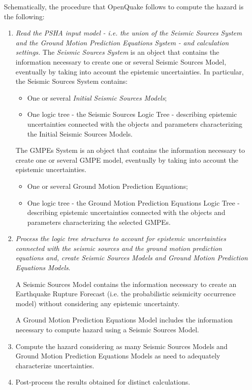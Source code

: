 Schematically, the procedure that OpenQuake follows to compute the hazard is the following:
%
\begin{enumerate}
%
\item \emph{Read the PSHA input model - i.e. the union of the Seismic Sources System and the Ground Motion Prediction Equations System - and calculation settings.}
	The \emph{Seismic Sources System} is an object that contains the information necessary to create one or several Seismic Sources Model, eventually by taking into account the epistemic uncertainties. 
	In particular, the Seismic Sources System contains:
	\begin{itemize}
	\item One or several \emph{Initial Seismic Sources Models};
	\item One logic tree - the Seismic Sources Logic Tree - describing epistemic uncertainties connected with the objects and parameters characterizing the Initial Seismic Sources Models.
	\end{itemize}
	The GMPEs System is an object that contains the information necessary to create one or several GMPE model, eventually by taking into account the epistemic uncertainties. 
	\begin{itemize}
	\item One or several Ground Motion Prediction Equations;
	\item One logic tree - the Ground Motion Prediction Equations Logic Tree - describing epistemic uncertainties connected with the objects and parameters characterizing the selected GMPEs.	
	\end{itemize}

%
\item \emph{Process the logic tree structures to account for epistemic uncertainties connected with the seismic sources and the ground motion prediction equations and, create Seismic Sources Models and Ground Motion Prediction Equations Models}.
	
	A Seismic Sources Model contains the information necessary to create an Earthquake Rupture Forecast (i.e. the probabilistic seismicity occurrence model) without considering any epistemic uncertainty.
	
	A Ground Motion Prediction Equations Model includes the information necessary to compute hazard using a Seismic Sources Model. 

\item Compute the hazard considering as many Seismic Sources Models and Ground Motion Prediction Equations Models as need to adequately characterize uncertainties.
\item Post-process the results obtained for distinct calculations.
\end{enumerate}
%